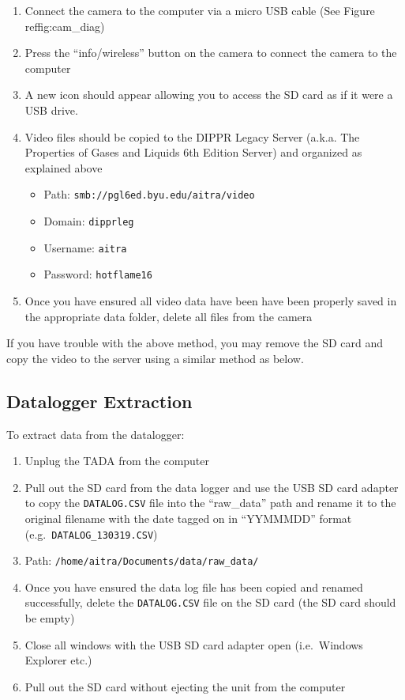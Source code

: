 \begin{enumerate}
\def\labelenumi{\arabic{enumi}.}
\tightlist
\item
  Connect the camera to the computer via a micro USB cable (See Figure
  reffig:cam\_diag)
\item
  Press the ``info/wireless'' button on the camera to connect the camera
  to the computer
\item
  A new icon should appear allowing you to access the SD card as if it
  were a USB drive.
\item
  Video files should be copied to the DIPPR Legacy Server (a.k.a. The
  Properties of Gases and Liquids 6th Edition Server) and organized as
  explained above

  \begin{itemize}
  \tightlist
  \item
    Path: \texttt{smb://pgl6ed.byu.edu/aitra/video}
  \item
    Domain: \texttt{dipprleg}
  \item
    Username: \texttt{aitra}
  \item
    Password: \texttt{hotflame16}
  \end{itemize}
\item
  Once you have ensured all video data have been have been properly
  saved in the appropriate data folder, delete all files from the camera
\end{enumerate}

If you have trouble with the above method, you may remove the SD card
and copy the video to the server using a similar method as below.

\hypertarget{datalogger-extraction}{%
\subsection{Datalogger Extraction}\label{datalogger-extraction}}

To extract data from the datalogger:

\begin{enumerate}
\def\labelenumi{\arabic{enumi}.}
\item
  Unplug the TADA from the computer
\item
  Pull out the SD card from the data logger and use the USB SD card
  adapter to copy the \texttt{DATALOG.CSV} file into the ``raw\_data''
  path and rename it to the original filename with the date tagged on in
  ``YYMMMDD'' format (e.g.~\texttt{DATALOG\_130319.CSV})
\item
  Path: \texttt{/home/aitra/Documents/data/raw\_data/}
\item
  Once you have ensured the data log file has been copied and renamed
  successfully, delete the \texttt{DATALOG.CSV} file on the SD card (the
  SD card should be empty)
\item
  Close all windows with the USB SD card adapter open (i.e.~Windows
  Explorer etc.)
\item
  Pull out the SD card without ejecting the unit from the computer
\end{enumerate}
